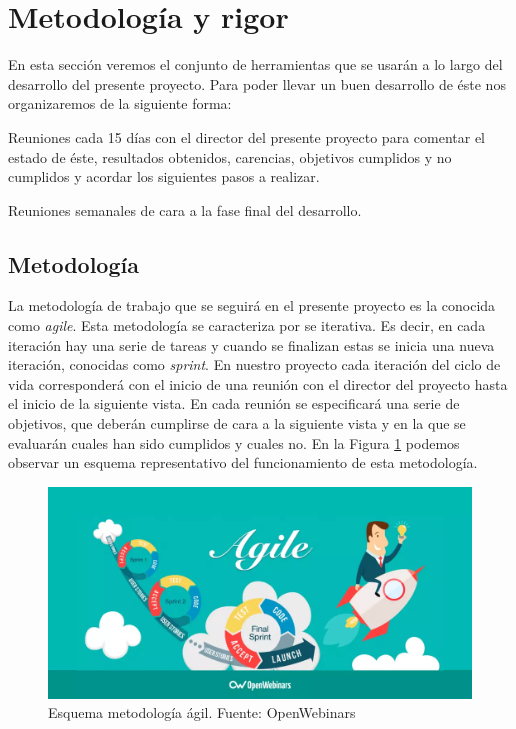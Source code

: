 \documentclass[titlepage,12pt]{report}
\begin{document}
\section{Metodología y rigor}

En esta sección veremos el conjunto de herramientas que se usarán a lo largo del desarrollo del presente proyecto. Para poder llevar un buen desarrollo de éste nos organizaremos de la siguiente forma: \begin{enumerate*}[label=\roman*)] \item Reuniones cada 15 días con el director del presente proyecto para comentar el estado de éste, resultados obtenidos, carencias, objetivos cumplidos y no cumplidos y acordar los siguientes pasos a realizar. \item Reuniones semanales de cara a la fase final del desarrollo. \end{enumerate*}

\subsection{Metodología}

La metodología de trabajo que se seguirá en el presente proyecto es la conocida como \textit{agile}. Esta metodología se caracteriza por se iterativa. Es decir, en cada iteración hay una serie de tareas y cuando se finalizan estas se inicia una nueva iteración, conocidas como \textit{sprint}. En nuestro proyecto cada iteración del ciclo de vida corresponderá con el inicio de una reunión con el director del proyecto hasta el inicio de la siguiente vista. En cada reunión se especificará una serie de objetivos, que deberán cumplirse de cara a la siguiente vista y en la que se evaluarán cuales han sido cumplidos y cuales no. En la Figura \ref{agile} podemos observar un esquema representativo del funcionamiento de esta metodología.

\begin{figure}[ht]
	\centering
	\includegraphics[scale=0.25]{media/agile.png}
	\caption{Esquema metodología ágil. Fuente: OpenWebinars}
	\label{agile}
\end{figure}
\end{document}
